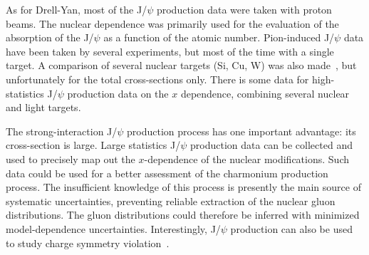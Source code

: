 As for Drell-Yan, most of the J/$\psi$ production data were taken with proton beams. The nuclear dependence  was primarily used for the evaluation of the absorption of the J/$\psi$ as a function of the atomic number.  Pion-induced J/$\psi$ data have been taken by several experiments, but most of the time with a single target.  A comparison of several nuclear targets (Si, Cu, W) was also made~\cite{Alexandrov:1999ch},   but unfortunately for the total cross-sections only. There is some data for high-statistics J/$\psi$ production data on the $x$ dependence, combining several nuclear and light targets. 

The strong-interaction J/$\psi$ production process has one important advantage: its cross-section is large.  Large statistics J/$\psi$ production data can be collected and  used to precisely map out the $x$-dependence of the nuclear modifications. Such data could be  used for a better assessment of the charmonium production process.  The insufficient knowledge of this process is presently the main source of systematic uncertainties, preventing reliable extraction of the nuclear gluon distributions.  The gluon distributions could  therefore be inferred with minimized model-dependence uncertainties. Interestingly, J/$\psi$ production can also be used to study charge symmetry violation~\cite{Piller:1995nc}. 
